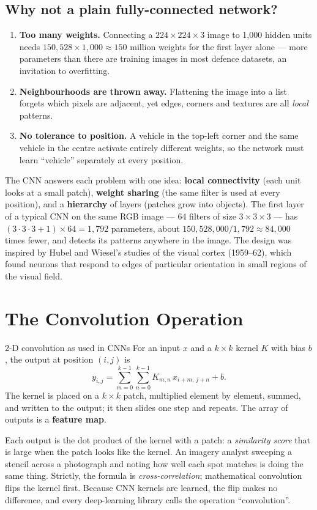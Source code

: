 \documentclass[11pt]{article}
\begin{document}
\subsection{Why not a plain fully-connected network?}
\begin{enumerate}
\item \textbf{Too many weights.} Connecting a $224\times224\times3$ image to 1,000 hidden units needs $150{,}528\times1{,}000\approx150$ million weights for the first layer alone --- more parameters than there are training images in most defence datasets, an invitation to overfitting.
\item \textbf{Neighbourhoods are thrown away.} Flattening the image into a list forgets which pixels are adjacent, yet edges, corners and textures are all \emph{local} patterns.
\item \textbf{No tolerance to position.} A vehicle in the top-left corner and the same vehicle in the centre activate entirely different weights, so the network must learn ``vehicle'' separately at every position.
\end{enumerate}
The CNN answers each problem with one idea: \textbf{local connectivity} (each unit looks at a small patch), \textbf{weight sharing} (the same filter is used at every position), and a \textbf{hierarchy} of layers (patches grow into objects). The first layer of a typical CNN on the same RGB image --- 64 filters of size $3\times3\times3$ --- has $(3\cdot3\cdot3+1)\times64=1{,}792$ parameters, about $150{,}528{,}000/1{,}792\approx84{,}000$ times fewer, and detects its patterns anywhere in the image. The design was inspired by Hubel and Wiesel's studies of the visual cortex (1959--62), which found neurons that respond to edges of particular orientation in small regions of the visual field.

\section{The Convolution Operation}\label{sec:conv}
\begin{definition}{2-D convolution as used in CNNs}
For an input $x$ and a $k\times k$ kernel $K$ with bias $b$, the output at position $(i,j)$ is
\[y_{i,j}=\sum_{m=0}^{k-1}\sum_{n=0}^{k-1}K_{m,n}\,x_{i+m,\,j+n}+b.\]
The kernel is placed on a $k\times k$ patch, multiplied element by element, summed, and written to the output; it then slides one step and repeats. The array of outputs is a \textbf{feature map}.
\end{definition}
Each output is the dot product of the kernel with a patch: a \emph{similarity score} that is large when the patch looks like the kernel. An imagery analyst sweeping a stencil across a photograph and noting how well each spot matches is doing the same thing. Strictly, the formula is \emph{cross-correlation}; mathematical convolution flips the kernel first. Because CNN kernels are learned, the flip makes no difference, and every deep-learning library calls the operation ``convolution''.
\end{document}
